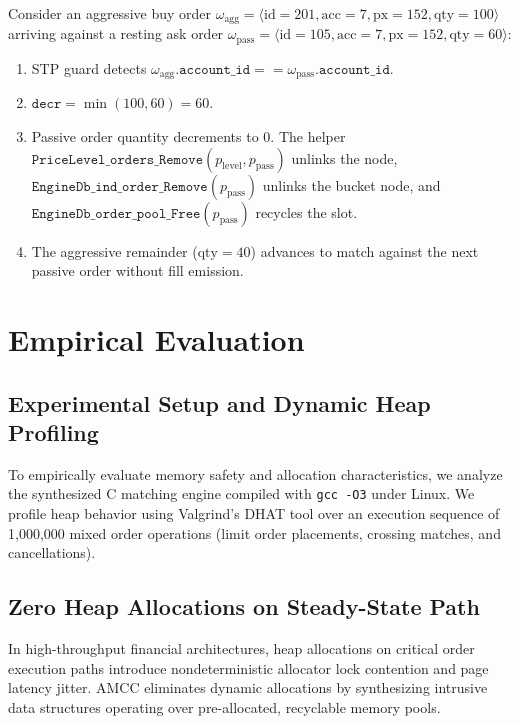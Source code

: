 \documentclass[11pt,a4paper]{article}
\begin{document}
Consider an aggressive buy order $\omega_{\text{agg}} = \langle \text{id}=201, \text{acc}=7, \text{px}=152, \text{qty}=100 \rangle$ arriving against a resting ask order $\omega_{\text{pass}} = \langle \text{id}=105, \text{acc}=7, \text{px}=152, \text{qty}=60 \rangle$:
\begin{enumerate}[nosep]
    \item STP guard detects $\omega_{\text{agg}}.\mathtt{account\_id} == \omega_{\text{pass}}.\mathtt{account\_id}$.
    \item $\mathtt{decr} = \min(100, 60) = 60$.
    \item Passive order quantity decrements to $0$. The helper $\mathtt{PriceLevel\_orders\_Remove}(p_{\text{level}}, p_{\text{pass}})$ unlinks the node, $\mathtt{EngineDb\_ind\_order\_Remove}(p_{\text{pass}})$ unlinks the bucket node, and $\mathtt{EngineDb\_order\_pool\_Free}(p_{\text{pass}})$ recycles the slot.
    \item The aggressive remainder ($\text{qty}=40$) advances to match against the next passive order without fill emission.
\end{enumerate}

\section{Empirical Evaluation}
\label{sec:eval}

\subsection{Experimental Setup and Dynamic Heap Profiling}

To empirically evaluate memory safety and allocation characteristics, we analyze the synthesized C matching engine compiled with \texttt{gcc -O3} under Linux. We profile heap behavior using Valgrind's DHAT tool over an execution sequence of 1,000,000 mixed order operations (limit order placements, crossing matches, and cancellations).

\subsection{Zero Heap Allocations on Steady-State Path}

In high-throughput financial architectures, heap allocations on critical order execution paths introduce nondeterministic allocator lock contention and page latency jitter. AMCC eliminates dynamic allocations by synthesizing intrusive data structures operating over pre-allocated, recyclable memory pools.
\end{document}
